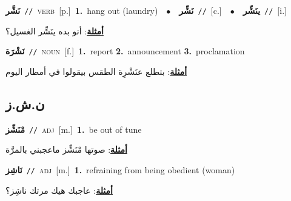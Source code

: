 \documentclass[10pt,a4paper,twoside]{article} %
\begin{document}
\begin{multicols}{2}
{\setlength\topsep{0pt}\textbf{\foreignlanguage{arabic}{نَشَّر}}\ {\color{gray}\texttt{//}\color{black}}\ \textsc{verb}\ [p.]\ \textbf{1.}~hang out (laundry)\ \ $\bullet$\ \ \setlength\topsep{0pt}\textbf{\foreignlanguage{arabic}{نَشِّر}}\ {\color{gray}\texttt{//}\color{black}}\ [c.]\ \ $\bullet$\ \ \setlength\topsep{0pt}\textbf{\foreignlanguage{arabic}{ينَشِّر}}\ {\color{gray}\texttt{//}\color{black}}\ [i.]\  \begin{flushright}\color{gray}\foreignlanguage{arabic}{\textbf{\underline{\foreignlanguage{arabic}{أمثلة}}}: أنو بده ينَشِّر الغسيل؟}\end{flushright}\color{black}} \vspace{2mm}

{\setlength\topsep{0pt}\textbf{\foreignlanguage{arabic}{نَشْرَة}}\ {\color{gray}\texttt{//}\color{black}}\ \textsc{noun}\ [f.]\ \textbf{1.}~report  \textbf{2.}~announcement  \textbf{3.}~proclamation\  \begin{flushright}\color{gray}\foreignlanguage{arabic}{\textbf{\underline{\foreignlanguage{arabic}{أمثلة}}}: بتطلع عنَشْرِة الطقس بيقولوا في أمطار اليوم}\end{flushright}\color{black}} \vspace{2mm}

\vspace{-3mm}
\subsection*{\color{blue}\foreignlanguage{arabic}{ن.ش.ز}\color{blue}{}} 

{\setlength\topsep{0pt}\textbf{\foreignlanguage{arabic}{مْنَشِّز}}\ {\color{gray}\texttt{//}\color{black}}\ \textsc{adj}\ [m.]\ \textbf{1.}~be out of tune\  \begin{flushright}\color{gray}\foreignlanguage{arabic}{\textbf{\underline{\foreignlanguage{arabic}{أمثلة}}}: صوتها مْنَشِّز ماعجبني بالمرَّة}\end{flushright}\color{black}} \vspace{2mm}

{\setlength\topsep{0pt}\textbf{\foreignlanguage{arabic}{نَاشِز}}\ {\color{gray}\texttt{//}\color{black}}\ \textsc{adj}\ [m.]\ \textbf{1.}~refraining from being obedient (woman)\  \begin{flushright}\color{gray}\foreignlanguage{arabic}{\textbf{\underline{\foreignlanguage{arabic}{أمثلة}}}: عاجبك هيك مرتك ناشِز؟}\end{flushright}\color{black}} \vspace{2mm}


\end{multicols}
\end{document}
